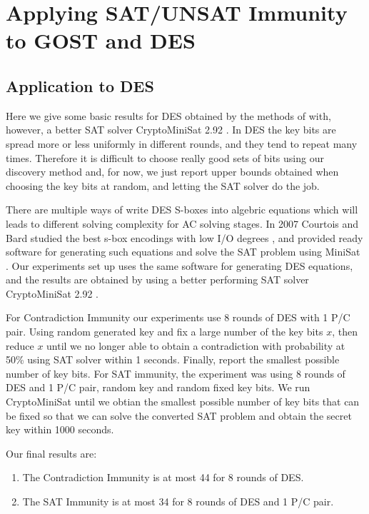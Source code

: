 \section{Applying SAT/UNSAT Immunity to GOST and DES}

\subsection{Application to DES}
Here we give some basic results for DES obtained by the methods of \cite{DEScourtois}
with, however, a better SAT solver CryptoMiniSat 2.92 \cite{CryptoMiniSat}. In DES the key bits are spread more or less uniformly in different rounds, and they tend to repeat many times. Therefore it is difficult to choose really good sets of bits using our discovery method and, for now, we just report upper bounds obtained when choosing
the key bits at random, and letting the SAT solver do the job. 

There are multiple ways of write DES S-boxes into algebric equations which will leads to different solving complexity for AC solving stages. In 2007 Courtois and Bard studied the best s-box encodings with low I/O degrees \cite{courtois2007algebraicDES}, and provided ready software for generating such equations and solve the SAT problem using MiniSat \cite{minisat}. Our experiments set up uses the same software for generating DES equations, and the results are obtained by using a better performing SAT solver CryptoMiniSat 2.92 \cite{CryptoMiniSat}.

For Contradiction Immunity our experiments use 8 rounds of DES with 1 P/C pair. Using random generated key and fix a large number of the key bits $x$, then reduce $x$ until we no longer able to obtain a contradiction with probability at 50\% using SAT solver within 1 seconds. Finally, report the smallest possible number of key bits. For SAT immunity, the experiment was using 8 rounds of DES and 1 P/C pair, random key and random fixed key bits. We run CryptoMiniSat until we obtian the smallest possible number of key bits that can be fixed so that we can solve the converted SAT problem and obtain the secret key within 1000 seconds.

Our final results are:
\begin{enumerate}
	\item The Contradiction Immunity
	is at most 44 for 8 rounds of DES.
	\item
	The SAT Immunity
	is at most 34 for 8 rounds of DES and 1 P/C pair.
\end{enumerate}

